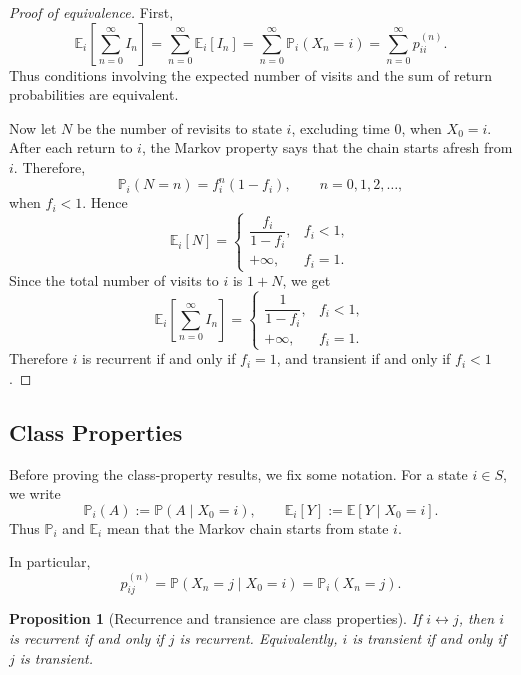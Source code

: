 \documentclass[11pt]{article}
\theoremstyle{plain}
\newtheorem{proposition}[theorem]{Proposition}
\theoremstyle{definition}
\theoremstyle{remark}
\begin{document}
\begin{proof}[Proof of equivalence]
	First,
	\[
	\mathbb{E}_i\!\left[\sum_{n=0}^{\infty}I_n\right]
	=
	\sum_{n=0}^{\infty}\mathbb{E}_i[I_n]
	=
	\sum_{n=0}^{\infty}\mathbb{P}_i(X_n=i)
	=
	\sum_{n=0}^{\infty}p_{ii}^{(n)}.
	\]
	Thus conditions involving the expected number of visits and the sum of return probabilities are equivalent.
	
	Now let \(N\) be the number of revisits to state \(i\), excluding time \(0\), when \(X_0=i\). After each return to \(i\), the Markov property says that the chain starts afresh from \(i\). Therefore,
	\[
	\mathbb{P}_i(N=n)=f_i^n(1-f_i),
	\qquad n=0,1,2,\dots,
	\]
	when \(f_i<1\). Hence
	\[
	\mathbb{E}_i[N]
	=
	\begin{cases}
		\dfrac{f_i}{1-f_i}, & f_i<1,\\[8pt]
		+\infty, & f_i=1.
	\end{cases}
	\]
	Since the total number of visits to \(i\) is \(1+N\), we get
	\[
	\mathbb{E}_i\!\left[\sum_{n=0}^{\infty}I_n\right]
	=
	\begin{cases}
		\dfrac{1}{1-f_i}, & f_i<1,\\[8pt]
		+\infty, & f_i=1.
	\end{cases}
	\]
	Therefore \(i\) is recurrent if and only if \(f_i=1\), and transient if and only if \(f_i<1\).
\end{proof}



\subsection{Class Properties}

Before proving the class-property results, we fix some notation. For a state \(i\in S\), we write
\[
\mathbb{P}_i(A):=\mathbb{P}(A\mid X_0=i),
\qquad
\mathbb{E}_i[Y]:=\mathbb{E}[Y\mid X_0=i].
\]
Thus \(\mathbb{P}_i\) and \(\mathbb{E}_i\) mean that the Markov chain starts from state \(i\).

In particular,
\[
p_{ij}^{(n)}
=
\mathbb{P}(X_n=j\mid X_0=i)
=
\mathbb{P}_i(X_n=j).
\]

\begin{proposition}[Recurrence and transience are class properties]
	If \(i\leftrightarrow j\), then \(i\) is recurrent if and only if \(j\) is recurrent. Equivalently, \(i\) is transient if and only if \(j\) is transient.
\end{proposition}
\end{document}
